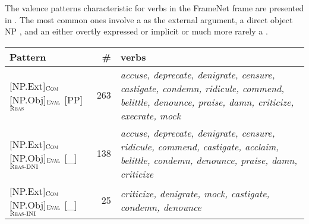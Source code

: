 \documentclass[output=paper,colorlinks,citecolor=brown]{langscibook}
\begin{document}
The valence patterns characteristic for verbs in the FrameNet frame  are presented in . The most common ones involve a  as the external argument, a direct object NP , and an  either overtly expressed or implicit  or much more rarely a .

\begin{table}
    \centering\footnotesize
    \begin{tabularx}{\textwidth}{ lrQ }
\lsptoprule
         Pattern  & \#  & verbs \\
\midrule
{[NP.Ext]}$_{\text{\textsc{Com}}}$ {[NP.Obj]}$_{\text{\textsc{Eval}}}$ {[PP]}$_{\text{\textsc{Reas}}}$  & 263 & \textit{accuse, deprecate, denigrate, censure, castigate, condemn, ridicule, commend, belittle, denounce, praise, damn, criticize, execrate, mock}\\

{[NP.Ext]}$_{\text{\textsc{Com}}}$ {[NP.Obj]}$_{\text{\textsc{Eval}}}$   {[\_]}$_{\text{\textsc{Reas-DNI}}}$  & 138 & \textit{accuse, deprecate, denigrate, censure, ridicule, commend, castigate, acclaim, belittle, condemn, denounce, praise, damn, criticize}\\


{[NP.Ext]}$_{\text{\textsc{Com}}}$ {[NP.Obj]}$_{\text{\textsc{Eval}}}$ {[\_]}$_{\text{\textsc{Reas-INI}}}$  & 25 & \textit{criticize, denigrate, mock, castigate, condemn, denounce}\\






\end{tabularx}
\end{table}
\end{document}
